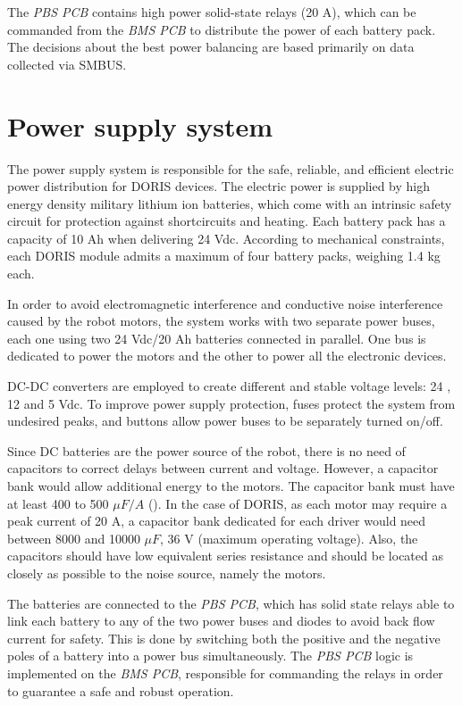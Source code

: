 \documentclass{ifacconf}
\begin{document}
The \emph{PBS PCB} contains high power solid-state relays (20 A), which can be
commanded from the \emph{BMS PCB} to distribute the power of each battery pack.
The decisions about the best power balancing are based primarily on data
collected via SMBUS.

\section{Power supply system}\label{sec:powersupply_overview}
The power supply system is responsible for the safe, reliable, and efficient
electric power distribution for DORIS devices. The electric power is supplied by
high energy density military lithium ion batteries, which come with an intrinsic
safety circuit for protection against shortcircuits and heating. Each battery
pack has a capacity of 10 Ah when delivering 24 Vdc. According to mechanical
constraints, each DORIS module admits a maximum of four battery packs, weighing
1.4 kg each.

In order to avoid electromagnetic interference and conductive noise interference
caused by the robot motors, the system works with two separate power buses, each
one using two 24 Vdc/20 Ah batteries connected in parallel. One bus is
dedicated to power the motors and the other to power all the electronic
devices.

DC-DC converters are employed to create different and stable voltage levels: 24
, 12 and 5 Vdc. To improve power supply protection, fuses protect the system
from undesired peaks, and buttons allow power buses to be separately turned on/off.

Since DC batteries are the power source of the robot, there is no need of
capacitors to correct delays between current and voltage. However, a capacitor
bank would allow additional energy to the motors. The capacitor bank must have
at least 400 to 500  $\mu F/A$ (\cite{capacitor}). In the case of DORIS, as each
motor may require a peak current of 20 A, a capacitor bank dedicated for each
driver would need between 8000 and 10000 $\mu F$, 36 V (maximum operating
voltage). Also, the capacitors should have low equivalent series resistance and
should be located as closely as possible to the noise source, namely the
motors.

The batteries are connected to the \emph{PBS PCB}, which has solid state relays
able to link each battery to any of the two power buses and diodes to avoid back
flow current for safety. This is done by switching both the positive and the
negative poles of a battery into a power bus simultaneously. The \emph{PBS PCB}
logic is implemented on the \emph{BMS PCB}, responsible for commanding the
relays in order to guarantee a safe and robust operation.
\end{document}
